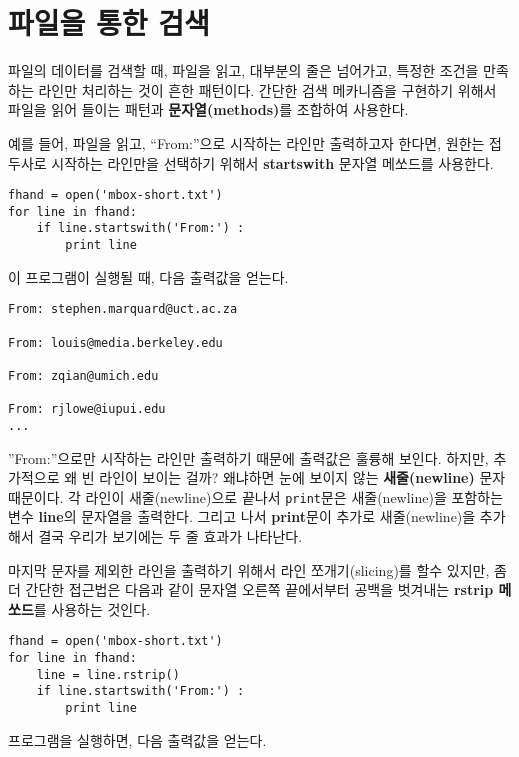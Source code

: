 \section{파일을 통한 검색}

파일의 데이터를 검색할 때, 파일을 읽고, 대부분의 줄은 넘어가고, 특정한 조건을 만족하는 라인만 처리하는 것이 흔한 패턴이다. 
간단한 검색 메카니즘을 구현하기 위해서 파일을 읽어 들이는 패턴과 {\bf 문자열(methods)}를 조합하여 사용한다.


예를 들어, 파일을 읽고, ``From:''으로 시작하는 라인만 출력하고자 한다면, 원한는 접두사로 시작하는 라인만을 선택하기 위해서 
{\bf startswith} 문자열 메쏘드를 사용한다.

\beforeverb
\begin{verbatim}
fhand = open('mbox-short.txt')
for line in fhand:
    if line.startswith('From:') :
        print line
\end{verbatim}
\afterverb
%

이 프로그램이 실행될 때, 다음 출력값을 얻는다.

\beforeverb
\begin{verbatim}
From: stephen.marquard@uct.ac.za

From: louis@media.berkeley.edu

From: zqian@umich.edu

From: rjlowe@iupui.edu
...
\end{verbatim}
\afterverb
%

''From:''으로만 시작하는 라인만 출력하기 때문에 출력값은 훌륭해 보인다.
하지만, 추가적으로 왜 빈 라인이 보이는 걸까? 왜냐하면 눈에 보이지 않는 {\bf 새줄(newline)} 문자 때문이다.
각 라인이 새줄(newline)으로 끝나서 {\tt print}문은 새줄(newline)을 포함하는 변수 {\bf line}의 문자열을 출력한다.
그리고 나서 {\bf print}문이 추가로 새줄(newline)을 추가해서 결국 우리가 보기에는 두 줄 효과가 나타난다.

마지막 문자를 제외한 라인을 출력하기 위해서 라인 쪼개기(slicing)를 할수 있지만, 좀더 간단한 접근법은 다음과 같이 문자열 오른쪽 끝에서부터 공백을 벗겨내는 
{\bf rstrip 메쏘드}를 사용하는 것인다.

\beforeverb
\begin{verbatim}
fhand = open('mbox-short.txt')
for line in fhand:
    line = line.rstrip()
    if line.startswith('From:') :
        print line
\end{verbatim}
\afterverb
%

프로그램을 실행하면, 다음 출력값을 얻는다.

